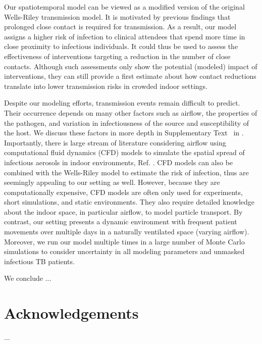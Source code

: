 \documentclass[fleqn,11pt]{wlscirep}
\begin{document}


Our spatiotemporal model can be viewed as a modified version of the original Wells-Riley transmission model\cite{Riley1978AJE}. It is motivated by previous findings that prolonged close contact is required for transmission\cite{Leung2020NatMed,Brankston2007LancetID,Narasimhan2013PulmonaryMed}. As a result, our model assigns a higher risk of infection to clinical attendees that spend more time in close proximity to infectious individuals. It could thus be used to assess the effectiveness of interventions targeting a reduction in the number of close contacts. Although such assessments only show the potential (modeled) impact of interventions, they can still provide a first estimate about how contact reductions translate into lower transmission risks in crowded indoor settings. 

Despite our modeling efforts, transmission events remain difficult to predict. Their occurrence depends on many other factors such as airflow, the properties of the pathogen, and variation in infectiousness of the source and susceptibility of the host\cite{Wang2021Science}. We discuss these factors in more depth in Supplementary Text~ in \supp. Importantly, there is large stream of literature considering airflow using computational fluid dynamics (CFD) models to simulate the spatial spread of infectious aerosols in indoor environments, \eg Ref. \cite{Vuorinen2020SafSci,Jung2021InfectChemo,Li2021BuildEnv}. CFD models can also be combined with the Wells-Riley model to estimate the risk of infection\cite{Yan2023BE,Qian2009BE,Li2022SOTTE}, thus are seemingly appealing to our setting as well. However, because they are computationally expensive, CFD models are often only used for experiments, short simulations, and static environments. They also require detailed knowledge about the indoor space, in particular airflow, to model particle transport. By contrast, our setting presents a dynamic environment with frequent patient movements over multiple days in a naturally ventilated space (varying airflow). Moreover, we run our model multiple times in a large number of Monte Carlo simulations to consider uncertainty in all modeling parameters and unmasked infectious TB patients. 



We conclude ...


\newpage


\section*{Acknowledgements}
...


\end{document}
